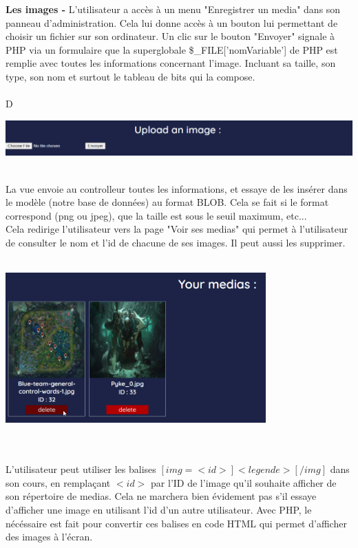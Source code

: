 \documentclass[a4paper,11pt]{article}
\begin{document}
\textbf{Les images - } L'utilisateur a accès à un menu "Enregistrer un media" dans son panneau d'administration. Cela lui donne accès à un bouton lui permettant de choisir un fichier sur son ordinateur. Un clic sur le bouton "Envoyer" signale à PHP via un formulaire que la superglobale \$\_FILE['nomVariable'] de PHP est remplie avec toutes les informations concernant l'image. Incluant sa taille, son type, son nom et surtout le tableau de bits qui la compose.\\\\D
\centerline{
    \includegraphics[width=14cm]{images/uploadImage.png}
}
\\La vue envoie au controlleur toutes les informations, et essaye de les insérer dans le modèle (notre base de données) au format BLOB. Cela se fait si le format correspond (png ou jpeg), que la taille est sous le seuil maximum, etc...\\
Cela redirige l'utilisateur vers la page "Voir ses medias" qui permet à l'utilisateur de consulter le nom et l'id de chacune de ses images. Il peut aussi les supprimer.\\\\
\centerline{
    \includegraphics[width=10cm]{images/displayImage.png}
}
\\\\L'utilisateur peut utiliser les balises $[img=<id>]<legende>[/img]$ dans son cours, en remplaçant $<id>$ par l'ID de l'image qu'il souhaite afficher de son répertoire de medias. Cela ne marchera bien évidement pas s'il essaye d'afficher une image en utilisant l'id d'un autre utilisateur. Avec PHP, le nécéssaire est fait pour convertir ces balises en code HTML qui permet d'afficher des images à l'écran.\\\\
\end{document}

